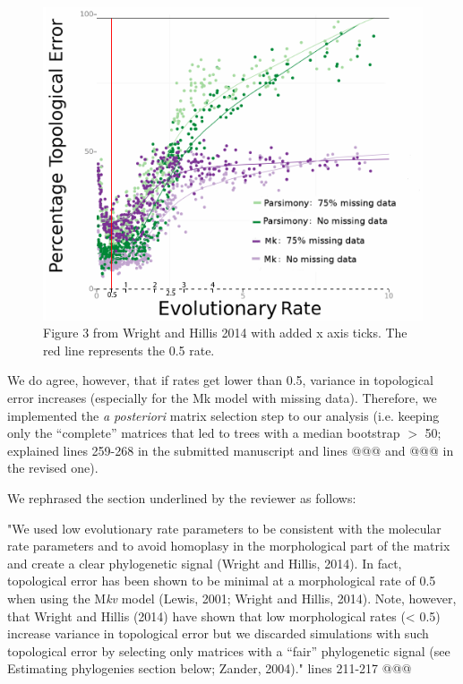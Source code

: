 \documentclass[12pt,letterpaper]{article}
\begin{document}
\begin{enumerate}
\begin{figure}[]
\centering
    \includegraphics[keepaspectratio=true]{response_fig1.pdf}
\caption{Figure 3 from Wright and Hillis 2014 with added x axis ticks. The red line represents the 0.5 rate.}
\end{figure}

We do agree, however, that if rates get lower than 0.5, variance in topological error increases (especially for the Mk model with missing data).
Therefore, we implemented the \textit{a posteriori} matrix selection step to our analysis (i.e. keeping only the ``complete'' matrices that led to trees with a median bootstrap $>$ 50; explained lines 259-268 in the submitted manuscript and lines @@@ and @@@ in the revised one).

We rephrased the section underlined by the reviewer as follows:

"We used low evolutionary rate parameters to be consistent with the molecular rate parameters and to avoid homoplasy in the morphological part of the matrix and create a clear phylogenetic signal (Wright and Hillis, 2014).
In fact, topological error has been shown to be minimal at a morphological rate of 0.5 when using the M\textit{kv} model (Lewis, 2001; Wright and Hillis, 2014).
Note, however, that Wright and Hillis (2014) have shown that low morphological rates (< 0.5) increase variance in topological error but we discarded simulations with such topological error by selecting only matrices with a “fair” phylogenetic signal (see Estimating phylogenies section below; Zander, 2004)." lines 211-217 @@@


\end{enumerate}
\end{document}
